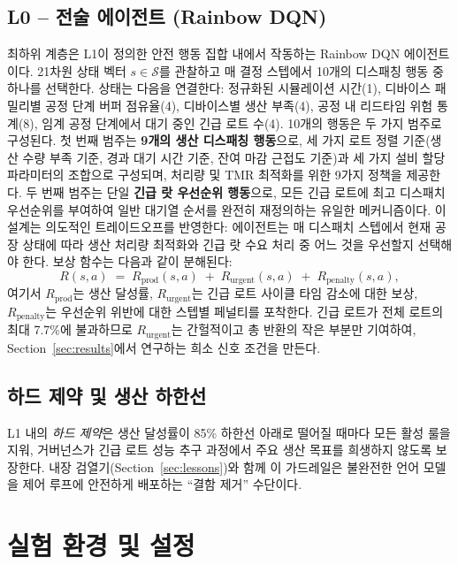 \documentclass[10pt]{article}
\begin{document}
\subsection{L0 -- 전술 에이전트 (Rainbow DQN)}
최하위 계층은 L1이 정의한 안전 행동 집합 내에서 작동하는 Rainbow DQN
에이전트\cite{hessel2018}이다. 21차원 상태 벡터 $s \in \mathcal{S}$를 관찰하고
매 결정 스텝에서 10개의 디스패칭 행동 중 하나를 선택한다.
상태는 다음을 연결한다: 정규화된 시뮬레이션 시간(1), 디바이스 패밀리별 공정 단계
버퍼 점유율(4), 디바이스별 생산 부족(4), 공정 내 리드타임 위험 통계(8),
임계 공정 단계에서 대기 중인 긴급 로트 수(4). 10개의 행동은 두 가지 범주로 구성된다.
첫 번째 범주는 \textbf{9개의 생산 디스패칭 행동}으로, 세 가지 로트 정렬 기준(생산 수량 부족 기준, 경과 대기 시간 기준, 잔여 마감 근접도 기준)과 세 가지 설비 할당 파라미터의 조합으로 구성되며, 처리량 및 TMR 최적화를 위한 9가지 정책을 제공한다.
두 번째 범주는 단일 \textbf{긴급 랏 우선순위 행동}으로, 모든 긴급 로트에 최고 디스패치 우선순위를 부여하여 일반 대기열 순서를 완전히 재정의하는 유일한 메커니즘이다.
이 설계는 의도적인 트레이드오프를 반영한다: 에이전트는 매 디스패치 스텝에서 현재 공장 상태에 따라 생산 처리량 최적화와 긴급 랏 수요 처리 중 어느 것을 우선할지 선택해야 한다. 보상 함수는 다음과 같이 분해된다:
\begin{equation}
  R(s,a) \;=\; R_{\text{prod}}(s,a) \;+\; R_{\text{urgent}}(s,a) \;+\; R_{\text{penalty}}(s,a),
  \label{eq:reward}
\end{equation}
여기서 $R_{\text{prod}}$는 생산 달성률, $R_{\text{urgent}}$는 긴급 로트 사이클
타임 감소에 대한 보상, $R_{\text{penalty}}$는 우선순위 위반에 대한 스텝별 페널티를
포착한다. 긴급 로트가 전체 로트의 최대 7.7\%에 불과하므로 $R_{\text{urgent}}$는
간헐적이고 총 반환의 작은 부분만 기여하여, Section~\ref{sec:results}에서 연구하는
희소 신호 조건을 만든다.

\subsection{하드 제약 및 생산 하한선}
L1 내의 \emph{하드 제약}은 생산 달성률이 85\% 하한선 아래로 떨어질 때마다
모든 활성 룰을 지워, 거버넌스가 긴급 로트 성능 추구 과정에서 주요 생산 목표를
희생하지 않도록 보장한다.
내장 검열기(Section~\ref{sec:lessons})와 함께 이 가드레일은 불완전한 언어 모델을
제어 루프에 안전하게 배포하는 ``결함 제거'' 수단이다.

\section{실험 환경 및 설정}
\label{sec:setup}
\end{document}
